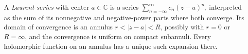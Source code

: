 
A \emph{Laurent series} with center $a\in\mathbb C$ is a series $\sum_{n=-\infty}^{\infty}c_n(z-a)^n$, interpreted as the sum of its nonnegative and negative-power parts where both converge. Its domain of convergence is an annulus $r<|z-a|<R$, possibly with $r=0$ or $R=\infty$, and the convergence is uniform on compact subannuli. Every holomorphic function on an annulus has a unique such expansion there.

